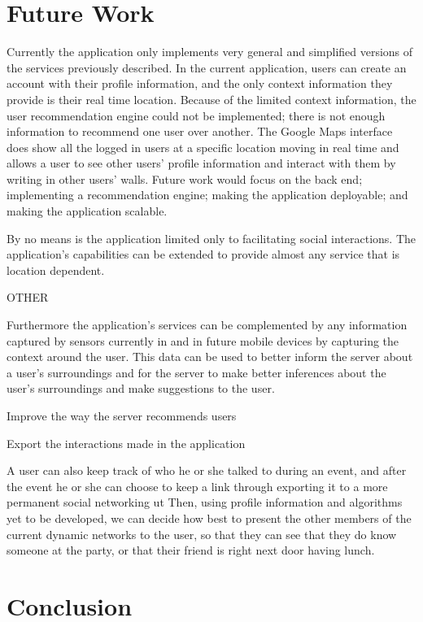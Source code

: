 \documentclass[11pt]{article}
\begin{document}
\section{Future Work}
{\color{red} 
Currently the application only implements very general and simplified versions of the services previously described. In the current application, users can create an account with their profile information, and the only context information they provide is their real time location. Because of the limited context information, the user recommendation engine could not be implemented; there is not enough information to recommend one user over another. The Google Maps interface does show all the logged in users at a specific location moving in real time and allows a user to see other users' profile information and interact with them by writing in other users' walls. Future work would focus on the back end; implementing a recommendation engine;  making the application deployable; and making the application scalable.


By no means is the application limited only to facilitating social interactions. The application's capabilities can be extended to provide almost any service that is location dependent. 


OTHER

Furthermore the application's services can be complemented by any information captured by sensors currently in and in future mobile devices by capturing the context around the user. This data can be used to better inform the server about a user's surroundings and for the server to make better inferences about the user's surroundings and make suggestions to the user.


Improve the way the server recommends users


Export the interactions made in the application


A user can also keep track of who he or she talked to during an event, and after the event he or she can choose to keep a link through exporting it to a more permanent social networking ut Then, using profile information and algorithms yet to be developed, we can decide how best to present the other members of the current dynamic networks to the user, so that they can see that they do know someone at the party, or that their friend is right next door having lunch.

}


 \section{Conclusion}
\end{document}
